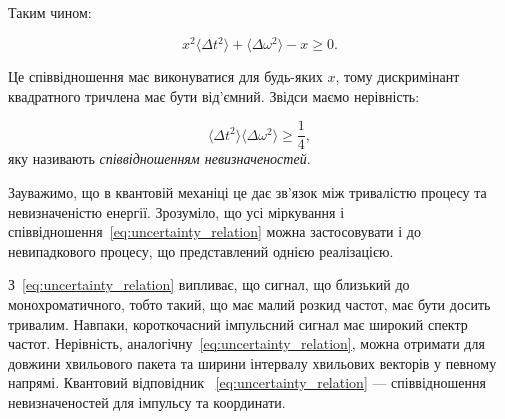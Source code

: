 Таким чином:

\begin{equation*}
    x^2 \langle \Delta t^2 \rangle + \langle \Delta \omega^2 \rangle - x \geqslant0.
\end{equation*}

Це співвідношення має виконуватися для будь-яких \( x \), тому дискримінант квадратного тричлена має бути від’ємний. Звідси маємо нерівність:

\begin{equation}
    \langle \Delta t^2 \rangle \langle \Delta \omega^2 \rangle \geqslant\frac{1}{4},
    \label{eq:uncertainty_relation}
\end{equation}
яку називають \emph{співвідношенням невизначеностей}.

Зауважимо, що в квантовій механіці це дає зв’язок між тривалістю процесу та невизначеністю енергії. Зрозуміло, що усі міркування і співвідношення~\eqref{eq:uncertainty_relation}  можна застосовувати і до невипадкового процесу, що представлений однією реалізацією.

З~\eqref{eq:uncertainty_relation} випливає, що сигнал, що близький до монохроматичного, тобто такий, що має малий розкид частот, має бути досить
тривалим. Навпаки, короткочасний імпульсний сигнал має широкий спектр частот. Нерівність, аналогічну~\eqref{eq:uncertainty_relation}, можна отримати для
довжини хвильового пакета та ширини інтервалу хвильових векторів у певному напрямі. Квантовий відповідник ~\eqref{eq:uncertainty_relation} --- співвідношення невизначеностей для
імпульсу та координати.